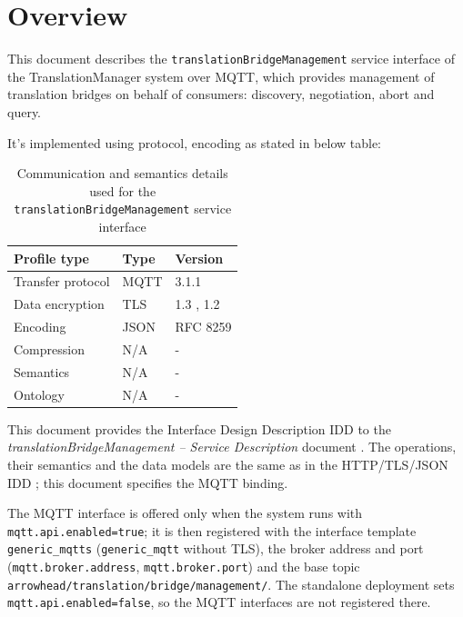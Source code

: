 \documentclass[a4paper]{arrowhead}
\begin{document}
\section{Overview}
\label{sec:overview}

This document describes the \texttt{translation\allowbreak{}Bridge\allowbreak{}Management} service interface of the TranslationManager system over MQTT, which provides management of translation bridges on behalf of consumers: discovery, negotiation, abort and query.

It's implemented using protocol, encoding as stated in below table:
\begin{table}[ht!]
  \centering
  \begin{tabular}{|l|l|l|}
    \hline
    \rowcolor{gray!33} Profile type & Type & Version \\ \hline
    Transfer protocol & MQTT & 3.1.1 \cite{mqtt311} \\ \hline
    Data encryption & TLS & 1.3 \cite{rfc8446}, 1.2 \cite{rfc5246} \\ \hline
    Encoding & JSON & RFC 8259 \cite{rfc8259} \\ \hline
    Compression & N/A & - \\ \hline
    Semantics & N/A & - \\ \hline
    Ontology & N/A & - \\ \hline
  \end{tabular}
  \caption{Communication and semantics details used for the \texttt{translation\allowbreak{}Bridge\allowbreak{}Management} service interface}
  \label{tab:comunication_semantics_profile}
\end{table}

This document provides the Interface Design Description IDD to the \textit{translationBridgeManagement -- Service Description} document \cite{tm-translationBridgeManagement-sd}.
The operations, their semantics and the data models are the same as in the HTTP/TLS/JSON IDD \cite{tm-translationBridgeManagement-http-idd}; this document specifies the MQTT binding.

The MQTT interface is offered only when the system runs with \texttt{mqtt.api.enabled=true}; it is then registered with the interface template \texttt{generic\_\allowbreak{}mqtts} (\texttt{generic\_\allowbreak{}mqtt} without TLS), the broker address and port (\texttt{mqtt.\allowbreak{}broker.\allowbreak{}address}, \texttt{mqtt.\allowbreak{}broker.\allowbreak{}port}) and the base topic \texttt{arrowhead/\allowbreak{}translation/\allowbreak{}bridge/\allowbreak{}management/\allowbreak{}}. The standalone deployment sets \texttt{mqtt.\allowbreak{}api.\allowbreak{}enabled=\allowbreak{}false}, so the MQTT interfaces are not registered there.
\end{document}
